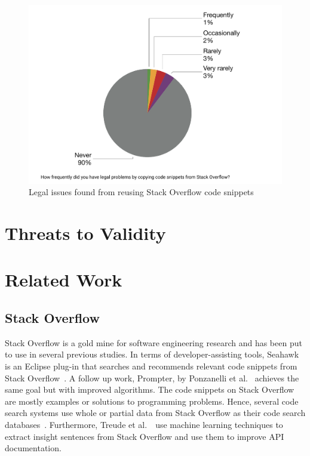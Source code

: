 \documentclass{svjour3}                     %
\begin{document}
\begin{figure} \centering
	\includegraphics[width=.4\linewidth]{survey_visitor_legal_issue} 
	\caption{Legal issues found from reusing Stack Overflow code snippets}
	\label{fig:survey_visitor_legal_issue} 
\end{figure}

\vspace{0.5cm} \noindent{} \vspace{0.5cm}

\section{Threats to Validity}

\section{Related Work}

\subsection{Stack Overflow}

Stack Overflow is a gold mine for software engineering research and has been put
to use in several previous studies. In terms of developer-assisting tools,
Seahawk is an Eclipse plug-in that searches and recommends relevant code
snippets from Stack Overflow~\citep{Ponzanelli2013}. A follow up work, Prompter,
by Ponzanelli et al.~\citep{Ponzanelli2014} achieves the same goal but with
improved algorithms. The code snippets on Stack Overflow are mostly examples or
solutions to programming problems. Hence, several code search systems use whole
or partial data from Stack Overflow as their code search
databases~\citep{Keivanloo2014,Park2014,
	Stolee2014,Subramanian2013,Diamantopoulos2015}. Furthermore, Treude et
al.~\cite{Treude2016}~use machine learning techniques to extract insight
sentences from Stack Overflow and use them to improve API documentation.
\end{document}
